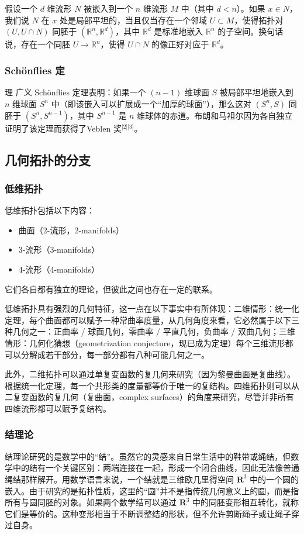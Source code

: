假设一个 $d$ 维流形 $N$ 被嵌入到一个 $n$ 维流形 $M$ 中（其中 $d < n$）。如果 $x \in N$，我们说 $N$ 在 $x$ 处是局部平坦的，当且仅当存在一个邻域 $U \subset M$，使得拓扑对 $(U, U \cap N)$ 同胚于 $(\mathbb{R}^n, \mathbb{R}^d)$，其中 $\mathbb{R}^d$ 是标准地嵌入 $\mathbb{R}^n$ 的子空间。换句话说，存在一个同胚 $U \to \mathbb{R}^n$，使得 $U \cap N$ 的像正好对应于 $\mathbb{R}^d$。
\subsubsection{Schönflies 定}理
广义 Schönflies 定理表明：如果一个 $(n-1)$ 维球面 $S$ 被局部平坦地嵌入到 $n$ 维球面 $S^n$ 中（即该嵌入可以扩展成一个“加厚的球面”），那么这对 $(S^n, S)$ 同胚于 $(S^n, S^{n-1})$，其中 $S^{n-1}$ 是 $n$ 维球体的赤道。布朗和马祖尔因为各自独立证明了该定理而获得了Veblen 奖\(^\text{[2][3]}\)。
\subsection{几何拓扑的分支}
\subsubsection{低维拓扑}
低维拓扑包括以下内容：
\begin{itemize}
\item 曲面（2-流形，2-manifolds）
\item 3-流形（3-manifolds）
\item 4-流形（4-manifolds）
\end{itemize}
它们各自都有独立的理论，但彼此之间也存在一定的联系。

低维拓扑具有强烈的几何特征，这一点在以下事实中有所体现：二维情形：统一化定理，每个曲面都可以赋予一种常曲率度量，从几何角度来看，它必然属于以下三种几何之一：正曲率 / 球面几何，零曲率 / 平直几何，负曲率 / 双曲几何；三维情形：几何化猜想（geometrization conjecture，现已成为定理）每个三维流形都可以分解成若干部分，每一部分都有八种可能几何之一。

此外，二维拓扑可以通过单复变函数的复几何来研究（因为黎曼曲面是复曲线）。根据统一化定理，每一个共形类的度量都等价于唯一的复结构。四维拓扑则可以从二复变函数的复几何（复曲面，complex surfaces）的角度来研究，尽管并非所有四维流形都可以赋予复结构。
\subsubsection{结理论}
结理论研究的是数学中的“结”。虽然它的灵感来自日常生活中的鞋带或绳结，但数学中的结有一个关键区别：两端连接在一起，形成一个闭合曲线，因此无法像普通绳结那样解开。用数学语言来说，一个结就是三维欧几里得空间 $\mathbf{R}^3$ 中的一个圆的嵌入。由于研究的是拓扑性质，这里的“圆”并不是指传统几何意义上的圆，而是指所有与圆同胚的对象。如果两个数学结可以通过 $\mathbf{R}^3$ 中的同胚变形相互转化，就称它们是等价的。这种变形相当于不断调整结的形状，但不允许剪断绳子或让绳子穿过自身。


